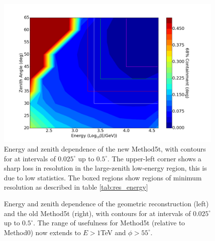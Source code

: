 \documentclass[main.tex]{subfiles}
\begin{document}
\begin{figure}[htbp]
  \centering
  \includegraphics[width=.9\linewidth]{images/disp_450x4size_contour}
  \caption[Energy and zenith dependence of the new Method5t.]{Energy and zenith dependence of the new Method5t, with contours for \rse at intervals of $0.025^\circ$ up to $0.5^\circ$. The upper-left corner shows a sharp loss in resolution in the large-zenith low-energy region, this is due to low statistics. The boxed regions show regions of minimum resolution as described in table \ref{tab:res_energy}}
  \label{fig:energy_new_contour}
\end{figure}

\begin{figure}[htbp]
  \centering
  \caption[Energy and zenith dependence of Method0 and the old Method5t]{Energy and zenith dependence of the geometric reconstruction (left) and the old Method5t (right), with contours for \rse at intervals of $0.025^\circ$ up to $0.5^\circ$. The range of usefulness for Method5t (relative to Method0) now extends to $E>1$TeV and $\phi>55^\circ$.}
  \label{fig:energy_contour}
\end{figure}
\end{document}
